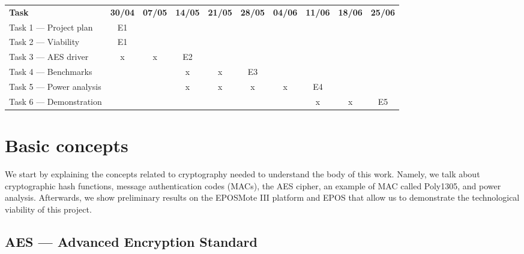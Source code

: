 \documentclass{../sftex/sftex}
\begin{document}
\begin{table}[htbp]
  \centering
  \begin{tabular}{lccccccccc}
    \textbf{Task}           & \textbf{30/04} & \textbf{07/05} & \textbf{14/05}
        & \textbf{21/05} & \textbf{28/05} & \textbf{04/06}
        & \textbf{11/06} & \textbf{18/06} & \textbf{25/06} \\
    Task 1 --- Project plan   & E1             &                &
        &                &                &
        &                &                &                \\
    Task 2 --- Viability      & E1             &                &
        &                &                &
        &                &                &                \\
    Task 3 --- AES driver     & x              & x              & E2
        &                &                &
        &                &                &                \\
    Task 4 --- Benchmarks     &                &                & x
        & x              & E3             &
        &                &                &                \\
    Task 5 --- Power analysis &                &                & x
        & x              & x              & x
        & E4             &                &                \\
    Task 6 --- Demonstration  &                &                &
        &                &                &
        & x              & x              & E5             \\
  \end{tabular}
\end{table}

\section{Basic concepts}

We start by explaining the concepts related to cryptography needed to
understand the body of this work. Namely, we talk about cryptographic hash
functions, message authentication codes (MACs), the AES cipher, an example of
MAC called Poly1305, and power analysis. Afterwards, we show preliminary
results on the EPOSMote III platform and EPOS that allow us to demonstrate the
technological viability of this project.

\subsection{AES --- Advanced Encryption Standard}
\end{document}
